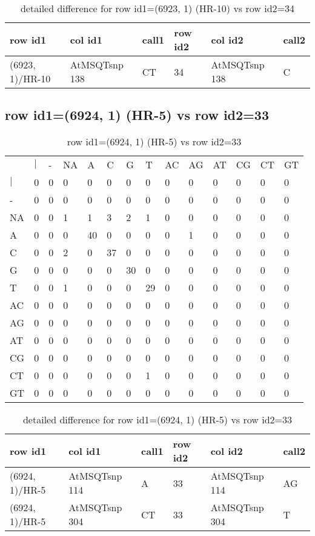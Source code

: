 \begin{center}
\begin{longtable}{|l|l|l|l|l|l|}
\caption{detailed difference for row id1=(6923, 1) (HR-10) vs row id2=34} \label{table_dm109}\\
\hline
row id1&col id1&call1&row id2&col id2&call2\\
\hline
(6923, 1)/HR-10&AtMSQTsnp 138&CT&34&AtMSQTsnp 138&C\\
\hline
\end{longtable}
\end{center}

\subsection{row id1=(6924, 1) (HR-5) vs row id2=33}
\begin{center}
\begin{longtable}{|l|l|l|l|l|l|l|l|l|l|l|l|l|l|}
\caption{row id1=(6924, 1) (HR-5) vs row id2=33} \label{table_dm110}\\
\hline
\\
\hline
&$|$&-&NA&A&C&G&T&AC&AG&AT&CG&CT&GT\\
$|$&0&0&0&0&0&0&0&0&0&0&0&0&0\\
-&0&0&0&0&0&0&0&0&0&0&0&0&0\\
NA&0&0&1&1&3&2&1&0&0&0&0&0&0\\
A&0&0&0&40&0&0&0&0&1&0&0&0&0\\
C&0&0&2&0&37&0&0&0&0&0&0&0&0\\
G&0&0&0&0&0&30&0&0&0&0&0&0&0\\
T&0&0&1&0&0&0&29&0&0&0&0&0&0\\
AC&0&0&0&0&0&0&0&0&0&0&0&0&0\\
AG&0&0&0&0&0&0&0&0&0&0&0&0&0\\
AT&0&0&0&0&0&0&0&0&0&0&0&0&0\\
CG&0&0&0&0&0&0&0&0&0&0&0&0&0\\
CT&0&0&0&0&0&0&1&0&0&0&0&0&0\\
GT&0&0&0&0&0&0&0&0&0&0&0&0&0\\
\hline
\end{longtable}
\end{center}

\begin{center}
\begin{longtable}{|l|l|l|l|l|l|}
\caption{detailed difference for row id1=(6924, 1) (HR-5) vs row id2=33} \label{table_dm111}\\
\hline
row id1&col id1&call1&row id2&col id2&call2\\
\hline
(6924, 1)/HR-5&AtMSQTsnp 114&A&33&AtMSQTsnp 114&AG\\
(6924, 1)/HR-5&AtMSQTsnp 304&CT&33&AtMSQTsnp 304&T\\
\hline
\end{longtable}
\end{center}

